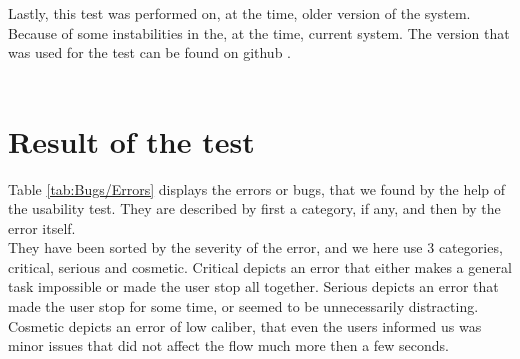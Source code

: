 Lastly, this test was performed on, at the time, older version of the system. Because of some instabilities in the, at the time, current system. The version that was used for the test can be found on github \citep{testBranch}.\\
\\

\section{Result of the test}
Table \ref{tab:Bugs/Errors} displays the errors or bugs, that we found by the help of the usability test. They are described by first a category, if any, and then by the error itself.\\
They have been sorted by the severity of the error, and we here use 3 categories, critical, serious and cosmetic. Critical depicts an error that either makes a general task impossible or made the user stop all together. Serious depicts an error that made the user stop for some time, or seemed to be unnecessarily distracting. Cosmetic depicts an error of low caliber, that even the users informed us was minor issues that did not affect the flow much more then a few seconds.\\
\\

